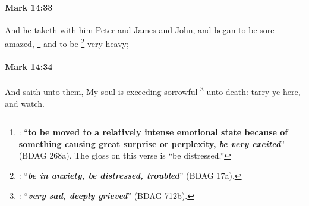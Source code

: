 		\paragraph{Mark 14:33} %
			\label{MARK-14-33}

			And he taketh with him Peter and James and John, and began to be sore amazed,%
				\footnote{%
					: ``\textbf{to be moved to a relatively intense emotional state because of something causing great surprise or perplexity, \textit{be very excited}}'' (BDAG 268a). The gloss on this verse is ``be distressed.''
					}
			and to be
				\footnote{%
					: ``\textbf{\textit{be in anxiety, be distressed, troubled}}'' (BDAG 17a).
					}%
			very heavy;

			\begin{framed}
			\scriptsize
				\begin{compactdesc}
					\item[SBLG] 
				\end{compactdesc}
			\end{framed}

		\paragraph{Mark 14:34} %
			\label{MARK-14-34}

			And saith unto them, My soul is exceeding sorrowful%
				\footnote{%
					: ``\textbf{\textit{very sad, deeply grieved}}'' (BDAG 712b).
					}
			unto death: tarry ye here, and watch.

